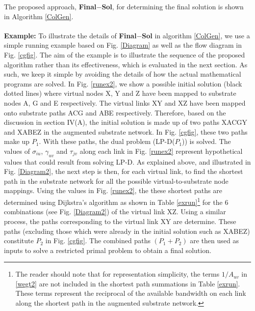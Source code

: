 \documentclass[journal]{IEEEtran}
\begin{document}
The proposed approach, \textbf{Final$-$Sol}, for determining the final solution is shown in Algorithm \ref{ColGen}.\\\\
\noindent \textbf{Example:} To illustrate the details of \textbf{Final$-$Sol} in algorithm \ref{ColGen}, we use a simple running example based on Fig. \ref{Diagram} as well as the flow diagram in Fig. \ref{cgfig}. The aim of the example is to illustrate the sequence of the proposed algorithm rather than its effectiveness, which is evaluated in the next section. As such, we keep it simple by avoiding the details of how the actual mathematical programs are solved. In Fig. \ref{runex2}, we show a possible initial solution (black dotted lines) where virtual nodes X, Y and Z have been mapped to substrate nodes A, G and E respectively. The virtual links XY and XZ have been mapped onto substrate paths ACG and ABE respectively. Therefore, based on the discussion in section IV(A), the initial solution is made up of two paths XACGY and XABEZ in the augmented substrate network. In Fig. \ref{cgfig}, these two paths make up $P_1$. With these paths, the dual problem (LP-D($P_1$)) is solved. The values of $\sigma_{iu}$, $\gamma_{uv}$ and $\tau_{jv}$ along each link in Fig. \ref{runex2} represent hypothetical values that could result from solving LP-D. As explained above, and illustrated in Fig. \ref{Diagram2}, the next step is then, for each virtual link, to find the shortest path in the substrate network for all the possible virtual-to-substrate node mappings. Using the values in Fig. \ref{runex2}, the these shortest paths are determined using Dijkstra's algorithm as shown in Table \ref{exrun}\footnote{The reader should note that for representation simplicity, the terms $1/A_{uv}$ in \eqref{wegt2} are not included in the shortest path summations in Table \ref{exrun}. These terms represent the reciprocal of the available bandwidth on each link along the shortest path in the augmented substrate network.} for the 6 combinations (see Fig. \ref{Diagram2}) of the virtual link XZ. Using a similar process, the paths corresponding to the virtual link XY are determine. These paths (excluding those which were already in the initial solution such as XABEZ) constitute $P_2$ in Fig. \ref{cgfig}.  The combined paths $(P_1 + P_2)$ are then used as inputs to solve a restricted primal problem to obtain a final solution.
\end{document}
